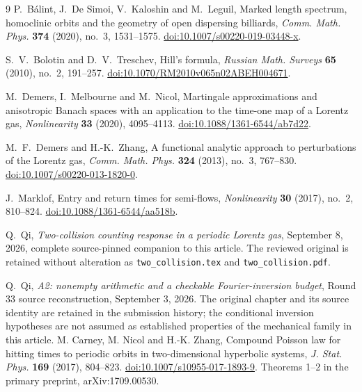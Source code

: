 \begin{thebibliography}{9}
P.~B\'alint, J.~De Simoi, V.~Kaloshin and M.~Leguil,
Marked length spectrum, homoclinic orbits and the geometry of open
dispersing billiards, \emph{Comm. Math. Phys.} \textbf{374} (2020),
no.~3, 1531--1575.
\href{https://doi.org/10.1007/s00220-019-03448-x}{doi:10.1007/s00220-019-03448-x}.

S.~V.~Bolotin and D.~V.~Treschev, Hill's formula,
\emph{Russian Math. Surveys} \textbf{65} (2010), no.~2, 191--257.
\href{https://doi.org/10.1070/RM2010v065n02ABEH004671}{doi:10.1070/RM2010v065n02ABEH004671}.

M.~Demers, I.~Melbourne and M.~Nicol, Martingale approximations and
anisotropic Banach spaces with an application to the time-one map of a
Lorentz gas, \emph{Nonlinearity} \textbf{33} (2020), 4095--4113.
\href{https://doi.org/10.1088/1361-6544/ab7d22}{doi:10.1088/1361-6544/ab7d22}.

M.~F.~Demers and H.-K.~Zhang, A functional analytic approach to
perturbations of the Lorentz gas, \emph{Comm. Math. Phys.}
\textbf{324} (2013), no.~3, 767--830.
\href{https://doi.org/10.1007/s00220-013-1820-0}{doi:10.1007/s00220-013-1820-0}.

J.~Marklof, Entry and return times for semi-flows,
\emph{Nonlinearity} \textbf{30} (2017), no.~2, 810--824.
\href{https://doi.org/10.1088/1361-6544/aa518b}{doi:10.1088/1361-6544/aa518b}.

Q.~Qi, \emph{Two-collision counting response in a periodic Lorentz gas},
September 8, 2026, complete source-pinned companion to this article.
The reviewed original is retained without alteration as
\texttt{two\_collision.tex} and \texttt{two\_collision.pdf}.

Q.~Qi, \emph{A2: nonempty arithmetic and a checkable Fourier-inversion
budget}, Round 33 source reconstruction, September 3, 2026.
The original chapter and its source identity are retained in the
submission history; the conditional inversion hypotheses are not assumed
as established properties of the mechanical family in this article.
M. Carney, M. Nicol and H.-K. Zhang,
Compound Poisson law for hitting times to periodic orbits in two-dimensional
hyperbolic systems, \emph{J. Stat. Phys.} \textbf{169} (2017), 804--823.
\href{https://doi.org/10.1007/s10955-017-1893-9}{doi:10.1007/s10955-017-1893-9}.
Theorems 1--2 in the primary preprint, arXiv:1709.00530.
\end{thebibliography}
